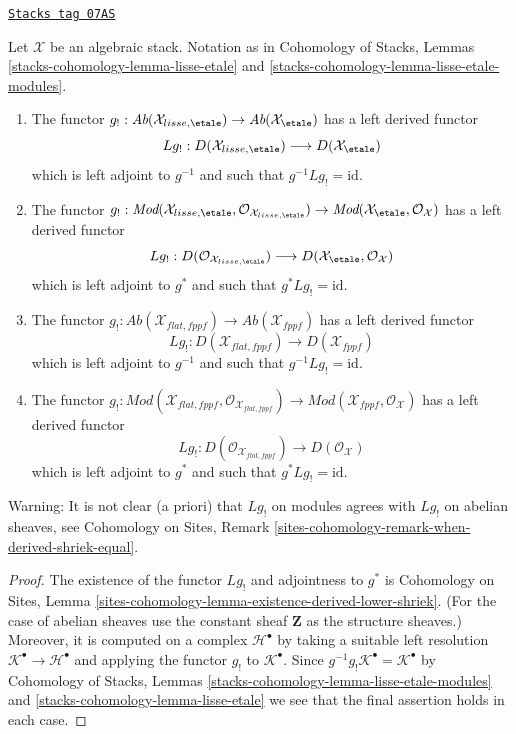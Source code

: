 \begin{lemma}
\label{stacks-perfect-lemma-shriek-derived}
\href{https://stacks.math.columbia.edu/tag/07AS}{\texttt{Stacks tag 07AS}}

Let $\mathcal{X}$ be an algebraic stack.
Notation as in
Cohomology of Stacks,
Lemmas \ref{stacks-cohomology-lemma-lisse-etale} and
\ref{stacks-cohomology-lemma-lisse-etale-modules}.
\begin{enumerate}
\item The functor
$g_! : \textit{Ab}(\mathcal{X}_{lisse,\etale}) \to
\textit{Ab}(\mathcal{X}_\etale)$
has a left derived functor
$$
Lg_! :
D(\mathcal{X}_{lisse,\etale})
\longrightarrow
D(\mathcal{X}_\etale)
$$
which is left adjoint to $g^{-1}$ and such that $g^{-1}Lg_! = \text{id}$.
\item The functor $g_! :
\textit{Mod}(\mathcal{X}_{lisse,\etale},
\mathcal{O}_{\mathcal{X}_{lisse,\etale}}) \to
\textit{Mod}(\mathcal{X}_\etale, \mathcal{O}_{\mathcal{X}})$
has a left derived functor
$$
Lg_! :
D(\mathcal{O}_{\mathcal{X}_{lisse,\etale}})
\longrightarrow
D(\mathcal{X}_\etale, \mathcal{O}_\mathcal{X})
$$
which is left adjoint to $g^*$ and such that $g^*Lg_! = \text{id}$.
\item The functor $g_! : \textit{Ab}(\mathcal{X}_{flat,fppf}) \to
\textit{Ab}(\mathcal{X}_{fppf})$
has a left derived functor
$$
Lg_! :
D(\mathcal{X}_{flat, fppf})
\longrightarrow
D(\mathcal{X}_{fppf})
$$
which is left adjoint to $g^{-1}$ and such that $g^{-1}Lg_! = \text{id}$.
\item The functor $g_! :
\textit{Mod}(\mathcal{X}_{flat,fppf},
\mathcal{O}_{\mathcal{X}_{flat,fppf}}) \to
\textit{Mod}(\mathcal{X}_{fppf}, \mathcal{O}_{\mathcal{X}})$
has a left derived functor
$$
Lg_! :
D(\mathcal{O}_{\mathcal{X}_{flat, fppf}})
\longrightarrow
D(\mathcal{O}_\mathcal{X})
$$
which is left adjoint to $g^*$ and such that $g^*Lg_! = \text{id}$.
\end{enumerate}
Warning: It is not clear (a priori) that $Lg_!$ on modules agrees
with $Lg_!$ on abelian sheaves, see
Cohomology on Sites, Remark
\ref{sites-cohomology-remark-when-derived-shriek-equal}.
\end{lemma}

\begin{proof}
The existence of the functor $Lg_!$ and adjointness to $g^*$ is
Cohomology on Sites, Lemma
\ref{sites-cohomology-lemma-existence-derived-lower-shriek}.
(For the case of abelian sheaves use the constant sheaf $\mathbf{Z}$
as the structure sheaves.)
Moreover, it is computed on a complex $\mathcal{H}^\bullet$
by taking a suitable left resolution
$\mathcal{K}^\bullet \to \mathcal{H}^\bullet$
and applying the functor $g_!$ to $\mathcal{K}^\bullet$.
Since $g^{-1}g_!\mathcal{K}^\bullet = \mathcal{K}^\bullet$ by
Cohomology of Stacks,
Lemmas \ref{stacks-cohomology-lemma-lisse-etale-modules} and
\ref{stacks-cohomology-lemma-lisse-etale}
we see that the final assertion holds in each case.
\end{proof}

